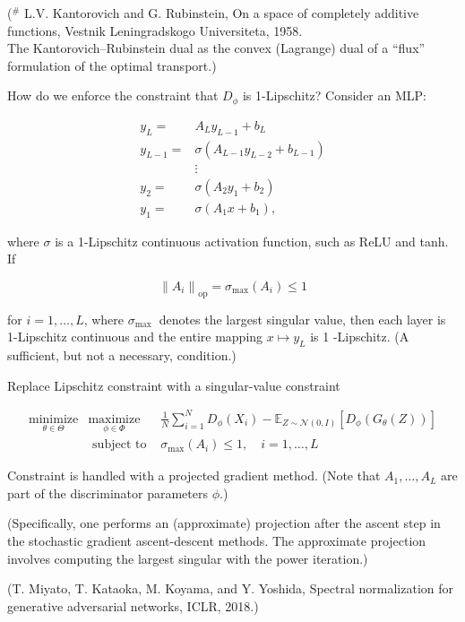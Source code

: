 \begin{definition}[21.29][WGAN]
    ($^{\#}$ L.V. Kantorovich and G. Rubinstein, On a space of completely additive functions, Vestnik Leningradskogo Universiteta, 1958.\\
    The Kantorovich–Rubinstein dual as the convex (Lagrange) dual of a “flux” formulation of the optimal transport.)
\end{definition}

\begin{concept}
    How do we enforce the constraint that $D_{\phi}$ is 1-Lipschitz? Consider an MLP:

    $$
    \begin{aligned}
    y_{L}= & A_{L} y_{L-1}+b_{L} \\
    y_{L-1}= & \sigma\left(A_{L-1} y_{L-2}+b_{L-1}\right) \\
    & \vdots \\
    y_{2}= & \sigma\left(A_{2} y_{1}+b_{2}\right) \\
    y_{1}= & \sigma\left(A_{1} x+b_{1}\right),
    \end{aligned}
    $$

    where $\sigma$ is a 1-Lipschitz continuous activation function, such as ReLU and tanh. If

    $$
    \left\|A_{i}\right\|_{\mathrm{op}}=\sigma_{\max }\left(A_{i}\right) \leq 1
    $$

    for $i=1, \ldots, L$, where $\sigma_{\text {max }}$ denotes the largest singular value, then each layer is 1-Lipschitz continuous and the entire mapping $x \mapsto y_{L}$ is 1 -Lipschitz. (A sufficient, but not a necessary, condition.)

    Replace Lipschitz constraint with a singular-value constraint

    $$
    \begin{array}{rll}
    \underset{\theta \in \Theta}{\operatorname{minimize}} & \underset{\phi \in \Phi}{\operatorname{maximize}} & \frac{1}{N} \sum_{i=1}^{N} D_{\phi}\left(X_{i}\right)-\mathbb{E}_{Z \sim \mathcal{N}(0, I)}\left[D_{\phi}\left(G_{\theta}(Z)\right)\right] \\
    & \text { subject to } & \sigma_{\max }\left(A_{i}\right) \leq 1, \quad i=1, \ldots, L
    \end{array}
    $$

    Constraint is handled with a projected gradient method. (Note that $A_{1}, \ldots, A_{L}$ are part of the discriminator parameters $\phi$.)

    (Specifically, one performs an (approximate) projection after the ascent step in the stochastic gradient ascent-descent methods. The approximate projection involves computing the largest singular with the power iteration.)

    (T. Miyato, T. Kataoka, M. Koyama, and Y. Yoshida, Spectral normalization for generative adversarial networks, ICLR, 2018.)
\end{concept}

